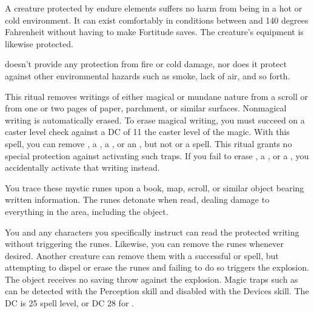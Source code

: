 \spelldur{\durext}
\spelleffect A creature protected by endure elements suffers no harm from being in a hot or cold environment. It can exist comfortably in conditions between  and 140 degrees Fahrenheit without having to make Fortitude saves. The creature's equipment is likewise protected.
\spellnotes \par {} doesn't provide any protection from fire or cold damage, nor does it protect against other environmental hazards such as smoke, lack of air, and so forth.

\spelleffect This ritual removes writings of either magical or mundane nature from a scroll or from one or two pages of paper, parchment, or similar surfaces. Nonmagical writing is automatically erased. To erase magical writing, you must succeed on a caster level check against a DC of 11 \add the caster level of the magic. 
\spellnotes With this spell, you can remove , a , a , or an , but not  or a  spell. This ritual grants no special protection against activating such traps. If you fail to erase , a , or a , you accidentally activate that writing instead.

\spelleffect You trace these mystic runes upon a book, map, scroll, or similar object bearing written information. The runes detonate when read, dealing damage to everything in the area, including the object.
\par You and any characters you specifically instruct can read the protected writing without triggering the runes. Likewise, you can remove the runes whenever desired. Another creature can remove them with a successful  or  spell, but attempting to dispel or erase the runes and failing to do so triggers the explosion.
\spellnotes The object receives no saving throw against the explosion. Magic traps such as  can be detected with the Perception skill and disabled with the Devices skill. The DC is 25 \add spell level, or DC 28 for .

